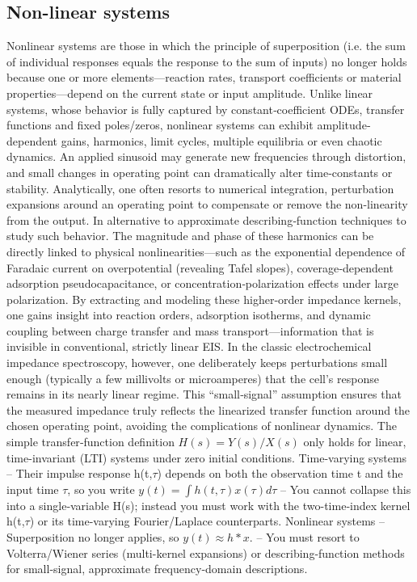 \subsection{Non-linear systems}
Nonlinear systems are those in which the principle of superposition (i.e. the sum of individual responses equals the response to the sum of inputs) no longer holds because one or more elements—reaction rates, transport coefficients or material properties—depend on the current state or input amplitude. Unlike linear systems, whose behavior is fully captured by constant‐coefficient ODEs, transfer functions and fixed poles/zeros, nonlinear systems can exhibit amplitude‐dependent gains, harmonics, limit cycles, multiple equilibria or even chaotic dynamics. An applied sinusoid may generate new frequencies through distortion, and small changes in operating point can dramatically alter time‐constants or stability. Analytically, one often resorts to numerical integration, perturbation expansions around an operating point to compensate or remove the non-linearity from the output. In alternative to approximate describing‐function techniques to study such behavior. The magnitude and phase of these harmonics can be directly linked to physical nonlinearities—such as the exponential dependence of Faradaic current on overpotential (revealing Tafel slopes), coverage‐dependent adsorption pseudocapacitance, or concentration‐polarization effects under large polarization. By extracting and modeling these higher‐order impedance kernels, one gains insight into reaction orders, adsorption isotherms, and dynamic coupling between charge transfer and mass transport—information that is invisible in conventional, strictly linear EIS. 
In the classic electrochemical impedance spectroscopy, however, one deliberately keeps perturbations small enough (typically a few millivolts or microamperes) that the cell’s response remains in its nearly linear regime. This “small‐signal” assumption ensures that the measured impedance truly reflects the linearized transfer function around the chosen operating point, avoiding the complications of nonlinear dynamics. 
The simple transfer‐function definition
$H(s)=Y(s)/X(s)$
only holds for linear, time-invariant (LTI) systems under zero initial conditions.
Time-varying systems
– Their impulse response h(t,$\tau$) depends on both the observation time t and the input time $\tau$, so you write
$y(t)=\int h(t,\tau)x(\tau)d\tau$
– You cannot collapse this into a single‐variable H(s); instead you must work with the two-time‐index kernel h(t,$\tau$) or its time-varying Fourier/Laplace counterparts.
Nonlinear systems
– Superposition no longer applies, so $y(t) \approx h * x$.
– You must resort to Volterra/Wiener series (multi-kernel expansions) or describing-function methods for small-signal, approximate frequency-domain descriptions.


